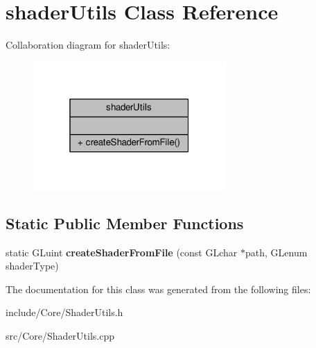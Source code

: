 \hypertarget{classshader_utils}{\section{shader\-Utils Class Reference}
\label{classshader_utils}
}


Collaboration diagram for shader\-Utils\-:
\nopagebreak
\begin{figure}[H]
\begin{center}
\leavevmode
\includegraphics[width=208pt]{classshader_utils__coll__graph}
\end{center}
\end{figure}
\subsection*{Static Public Member Functions}
\begin{DoxyCompactItemize}
\item 
\hypertarget{classshader_utils_a3965740e88364f65e4af4e751cf973b4}{static G\-Luint {\bfseries create\-Shader\-From\-File} (const G\-Lchar $\ast$path, G\-Lenum shader\-Type)}\label{classshader_utils_a3965740e88364f65e4af4e751cf973b4}

\end{DoxyCompactItemize}


The documentation for this class was generated from the following files\-:\begin{DoxyCompactItemize}
\item 
include/\-Core/Shader\-Utils.\-h\item 
src/\-Core/Shader\-Utils.\-cpp\end{DoxyCompactItemize}
